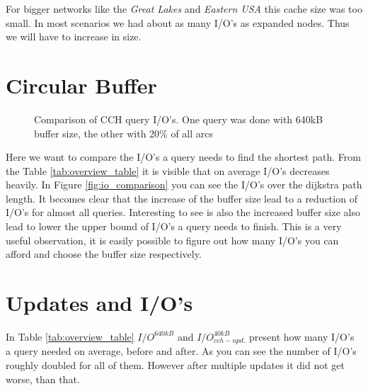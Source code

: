 For bigger networks like the \textit{Great Lakes} and \textit{Eastern USA} this cache size was too small.
In most scenarios we had about as many I/O's as  expanded nodes.
Thus we will have to increase in size.

\section{Circular Buffer}

\begin{figure}[H]
    
    \caption{Comparison of CCH query I/O's. One query was done with 640kB buffer size, the other with 20\% of all arcs}
    \label{fig:coloradoBufferComp}
\end{figure}

Here we want to compare the I/O's a query needs to find the shortest path.
From the Table \ref{tab:overview_table}  it is visible that on average I/O's decreases heavily.
In Figure \ref{fig:io_comparison} you can see the I/O's over the dijkstra path length.
It becomes clear that the increase of the buffer size lead to a reduction of I/O's for almost all queries.
Interesting to see is also the increased buffer size also lead to lower the upper bound of I/O's a query needs to finish.
This is a very useful observation, it is easily possible to figure out how many I/O's you can afford and choose the buffer size respectively.


\section{Updates and I/O's}

In Table \ref{tab:overview_table} $ I/O^{640kB}$ and $I/O^{40kB}_{cch-upd.}$  present how many I/O's a query needed on average, before and after.
As you can see the number of I/O's roughly doubled for all of them. However after multiple updates it did not get worse, than that. 



